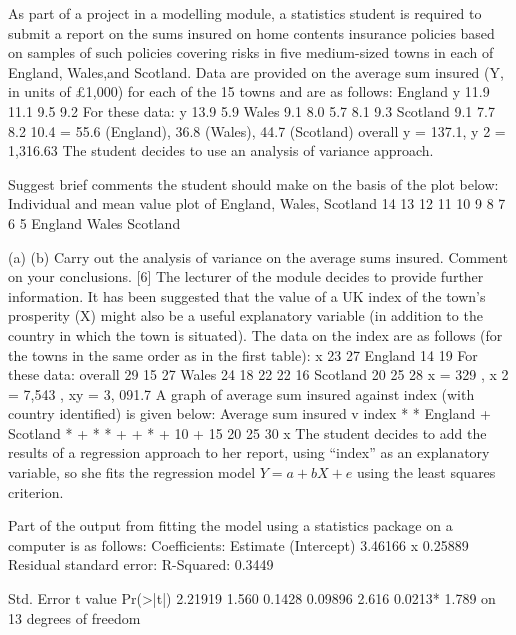 \documentclass[a4paper,12pt]{article}
\begin{document}
As part of a project in a modelling module, a statistics student is required to submit a
report on the sums insured on home contents insurance policies based on samples of such policies covering risks in five medium-sized towns in each of England, Wales,and Scotland. Data are provided on the average sum insured (Y, in units of £1,000)
for each of the 15 towns and are as follows:
England
y 11.9 11.1 9.5 9.2
For these data:
\sum y
13.9
5.9
Wales
9.1 8.0 5.7
8.1
9.3
Scotland
9.1 7.7 8.2
10.4
= 55.6 (England), 36.8 (Wales), 44.7 (Scotland)
overall
\sum y = 137.1, \sum y 2
= 1,316.63
The student decides to use an analysis of variance approach.
\item 
Suggest brief comments the student should make on the basis of the plot
below:
Individual and mean value plot of England, Wales, Scotland
14
13
12
11
10
9
8
7
6
5
England
Wales
Scotland

\item 
(a)
(b)
Carry out the analysis of variance on the average sums insured.
Comment on your conclusions.
[6]
The lecturer of the module decides to provide further information. It has been suggested that the value of a UK index of the town’s prosperity (X) might also be a useful explanatory variable (in addition to the country in which the town is situated).
The data on the index are as follows (for the towns in the same order as in the first
table):
x
23
27
England
14 19
For these data: overall
29
15
27
Wales
24 18
22
22
16
Scotland
20 25
28
\sum x = 329 , \sum x 2 = 7,543 , \sum xy = 3, 091.7
A graph of average sum insured against index (with country identified) is given
below:
Average sum insured v index
*
* England
+ Scotland
*
+
*
*
+
+
*
%
+
%
10
%
+
%
%
15
20
25
30
x
The student decides to add the results of a regression approach to her report, using “index” as an explanatory variable, so she fits the regression model
$Y = a + bX + e$
using the least squares criterion.


Part of the output from fitting the model using a statistics package on a computer is as follows:
Coefficients: Estimate
(Intercept) 3.46166
x
0.25889
Residual standard error:
R-Squared: 0.3449
\item 
Std. Error t value Pr(>|t|)
2.21919
1.560 0.1428
0.09896
2.616 0.0213*
1.789 on 13 degrees of freedom
\end{document}
